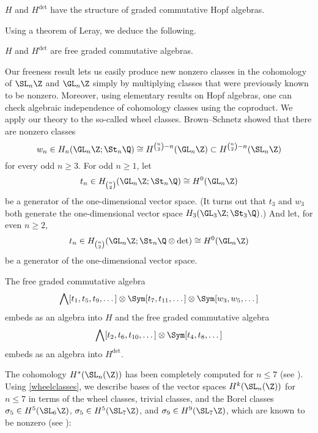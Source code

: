 \begin{atheorem}\label{H(GL)}
$H$ and $H^{\det}$   have the structure of graded commutative Hopf algebras.

\end{atheorem}

Using a theorem of Leray, we deduce the following.

\begin{corollary}\label{introcor}
$H$ and $H^{\det}$  are free graded commutative algebras. 
\end{corollary}


Our freeness result lets us easily produce new nonzero classes in the cohomology of $\SL_n \Z$ and $\GL_n \Z$ simply by multiplying classes that were previously known to be nonzero. Moreover, using elementary results on Hopf algebras, one can check algebraic independence of cohomology classes using the coproduct. We apply our theory to the so-called wheel classes. Brown--Schnetz \cite[Theorem 4(i)]{Brown24} showed that there are nonzero classes 
\[w_n \in H_n(\GL_n \Z; \St_n \Q) \cong H^{\binom n2 - n}(\GL_n \Z) \subset H^{\binom n2 - n}(\SL_n \Z) \]
for every odd $n\ge 3$. For odd $n\ge1$, let
\[t_n \in H_{\binom n2}(\GL_n \Z; \St_n \Q)  \cong H^0(\GL_n \Z)\]
be a generator of the one-dimensional vector space. (It turns out that $t_3$ and $w_3$ both generate the one-dimensional vector space $H_3(\GL_3\Z; \St_3\Q)$.) And let, for even $n \ge 2$,
\[t_n \in H_{\binom n2}(\GL_n \Z;\St_n \Q\otimes \det)  \cong H^0(\GL_n \Z)\]
be a generator of the one-dimensional vector space.


\begin{atheorem}\label{wheelclasses}
The free graded commutative algebra 
\[ \bigwedge[t_1,t_5,t_9,\dots] \otimes \Sym[t_7,t_{11},\dots] \otimes \Sym[w_3,w_5,\dots]\]
 embeds as an algebra into $H$ and the free graded commutative algebra
\[ \bigwedge[t_2,t_6,t_{10} ,\dots] \otimes \Sym[t_4,t_8,\dots]\] 
embeds as an algebra into $H^{\det}$.
\end{atheorem}

The cohomology $H^*(\SL_n(\Z))$ has been completely computed for $n \leq 7$ (see \cite{soule,Horozov,EVGS}). Using \autoref{wheelclasses}, we describe bases of the vector spaces $H^k(\SL_n(\Z))$ for $n \leq 7$ in terms of the wheel classes, trivial classes, and the Borel classes $\sigma_{5} \in H^5(\SL_6 \Z)$, $\sigma_5\in H^5(\SL_7 \Z)$, and $\sigma_9 \in H^9(\SL_7 \Z)$, which are known to be nonzero (see \cite{Bor, Franke, BenaSanderJeff, Brown23}):


